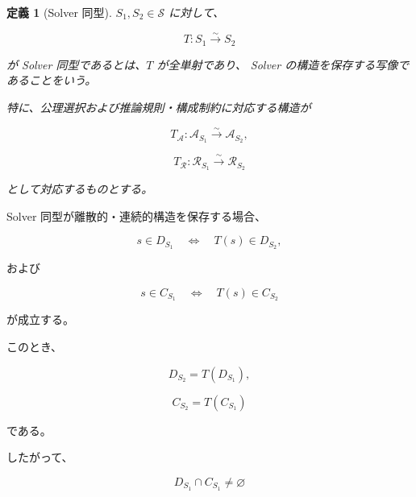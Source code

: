 \documentclass[a4paper,11pt]{article}
\newtheorem{definition}{定義}[section]
\newcommand{\Solver}{\mathcal{S}}
\newcommand{\Aset}{\mathcal{A}}
\newcommand{\Rset}{\mathcal{R}}
\begin{document}
\begin{definition}[Solver 同型]
$S_1,S_2\in\Solver$ に対して、

\begin{equation}
    T:
    S_1
    \overset{\sim}{\longrightarrow}
    S_2
\end{equation}

が Solver 同型であるとは、$T$ が全単射であり、
Solver の構造を保存する写像であることをいう。

特に、公理選択および推論規則・構成制約に対応する構造が

\begin{equation}
    T_{\mathcal{A}}:
    \Aset_{S_1}
    \overset{\sim}{\longrightarrow}
    \Aset_{S_2},
\end{equation}

\begin{equation}
    T_{\mathcal{R}}:
    \Rset_{S_1}
    \overset{\sim}{\longrightarrow}
    \Rset_{S_2}
\end{equation}

として対応するものとする。
\end{definition}

Solver 同型が離散的・連続的構造を保存する場合、

\begin{equation}
    s\in D_{S_1}
    \quad\Longleftrightarrow\quad
    T(s)\in D_{S_2},
    \label{eq:A-discrete-isomorphism}
\end{equation}

および

\begin{equation}
    s\in C_{S_1}
    \quad\Longleftrightarrow\quad
    T(s)\in C_{S_2}
    \label{eq:A-continuous-isomorphism}
\end{equation}

が成立する。

このとき、

\begin{equation}
    D_{S_2}
    =
    T(D_{S_1}),
\end{equation}

\begin{equation}
    C_{S_2}
    =
    T(C_{S_1})
\end{equation}

である。

したがって、

\begin{equation}
    D_{S_1}\cap C_{S_1}
    \neq
    \varnothing
\end{equation}
\end{document}
